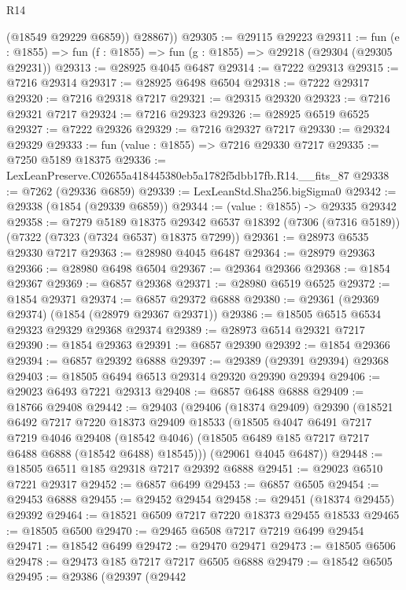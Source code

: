 \begin{lexlean}{R14}
\begin{coremodule}
          (@18549 @29229 @6859))
        @28867))
@29305 := @29115 @29223
@29311 := fun (e : @1855) => fun (f : @1855) => fun (g : @1855) => @29218 (@29304 (@29305 @29231))
@29313 := @28925 @4045 @6487
@29314 := @7222 @29313
@29315 := @7216 @29314
@29317 := @28925 @6498 @6504
@29318 := @7222 @29317
@29320 := @7216 @29318 @7217
@29321 := @29315 @29320
@29323 := @7216 @29321 @7217
@29324 := @7216 @29323
@29326 := @28925 @6519 @6525
@29327 := @7222 @29326
@29329 := @7216 @29327 @7217
@29330 := @29324 @29329
@29333 := fun (value : @1855) => @7216 @29330 @7217
@29335 := @7250 @5189 @18375
@29336 := LexLeanPreserve.C02655a418445380eb5a1782f5dbb17fb.R14.__fits_87
@29338 := @7262 (@29336 @6859)
@29339 := LexLeanStd.Sha256.bigSigma0
@29342 := @29338 (@1854 (@29339 @6859))
@29344 := (value : @1855) -> @29335 @29342
@29358 := @7279
    @5189
    @18375
    @29342
    @6537
    @18392
    (@7306 (@7316 @5189))
    (@7322 (@7323 (@7324 @6537) @18375 @7299))
@29361 := @28973 @6535 @29330 @7217
@29363 := @28980 @4045 @6487
@29364 := @28979 @29363
@29366 := @28980 @6498 @6504
@29367 := @29364 @29366
@29368 := @1854 @29367
@29369 := @6857 @29368
@29371 := @28980 @6519 @6525
@29372 := @1854 @29371
@29374 := @6857 @29372 @6888
@29380 := @29361 (@29369 @29374) (@1854 (@28979 @29367 @29371))
@29386 := @18505 @6515 @6534 @29323 @29329 @29368 @29374
@29389 := @28973 @6514 @29321 @7217
@29390 := @1854 @29363
@29391 := @6857 @29390
@29392 := @1854 @29366
@29394 := @6857 @29392 @6888
@29397 := @29389 (@29391 @29394) @29368
@29403 := @18505 @6494 @6513 @29314 @29320 @29390 @29394
@29406 := @29023 @6493 @7221 @29313
@29408 := @6857 @6488 @6888
@29409 := @18766 @29408
@29442 := @29403
    (@29406
      (@18374 @29409)
      @29390
      (@18521
        @6492
        @7217
        @7220
        @18373
        @29409
        @18533
        (@18505
          @4047
          @6491
          @7217
          @7219
          @4046
          @29408
          (@18542 @4046)
          (@18505 @6489 @185 @7217 @7217 @6488 @6888 (@18542 @6488) @18545)))
      (@29061 @4045 @6487))
@29448 := @18505 @6511 @185 @29318 @7217 @29392 @6888
@29451 := @29023 @6510 @7221 @29317
@29452 := @6857 @6499
@29453 := @6857 @6505
@29454 := @29453 @6888
@29455 := @29452 @29454
@29458 := @29451 (@18374 @29455) @29392
@29464 := @18521 @6509 @7217 @7220 @18373 @29455 @18533
@29465 := @18505 @6500
@29470 := @29465 @6508 @7217 @7219 @6499 @29454
@29471 := @18542 @6499
@29472 := @29470 @29471
@29473 := @18505 @6506
@29478 := @29473 @185 @7217 @7217 @6505 @6888
@29479 := @18542 @6505
@29495 := @29386
    (@29397
      (@29442

\end{coremodule}
\end{lexlean}
